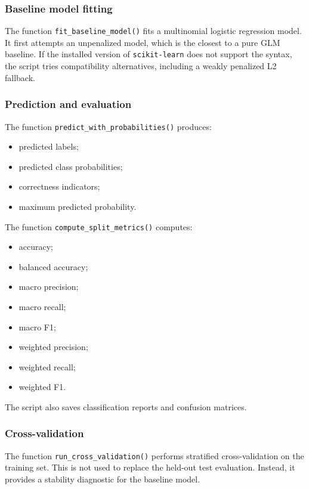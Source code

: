 \documentclass{ipgpmaster}
\begin{document}
\subsubsection{Baseline model fitting}

The function \texttt{fit\_baseline\_model()} fits a multinomial logistic regression model. It first attempts an unpenalized model, which is the closest to a pure GLM baseline. If the installed version of \texttt{scikit-learn} does not support the syntax, the script tries compatibility alternatives, including a weakly penalized L2 fallback.

\subsubsection{Prediction and evaluation}

The function \texttt{predict\_with\_probabilities()} produces:

\begin{itemize}
    \item predicted labels;
    \item predicted class probabilities;
    \item correctness indicators;
    \item maximum predicted probability.
\end{itemize}

The function \texttt{compute\_split\_metrics()} computes:

\begin{itemize}
    \item accuracy;
    \item balanced accuracy;
    \item macro precision;
    \item macro recall;
    \item macro F1;
    \item weighted precision;
    \item weighted recall;
    \item weighted F1.
\end{itemize}

The script also saves classification reports and confusion matrices.

\subsubsection{Cross-validation}

The function \texttt{run\_cross\_validation()} performs stratified cross-validation on the training set. This is not used to replace the held-out test evaluation. Instead, it provides a stability diagnostic for the baseline model.
\end{document}
